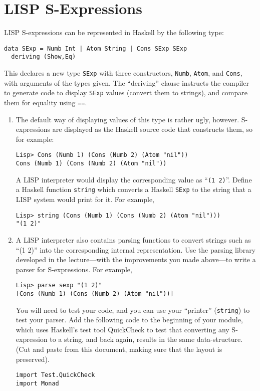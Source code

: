 \documentclass{article}
\begin{document}
\section{LISP S-Expressions}
LISP S-expressions can be represented in Haskell by the following
type:
\begin{verbatim}
data SExp = Numb Int | Atom String | Cons SExp SExp
  deriving (Show,Eq)
\end{verbatim}
This declares a new type \verb!SExp! with three constructors,
\verb!Numb!, \verb!Atom!, and \verb!Cons!, with arguments of the types
given. The ``deriving'' clause instructs the compiler to generate code
to display \verb!SExp! values (convert them to strings), and compare
them for equality using \verb!==!.

\begin{enumerate}
\item
The default way of displaying values of this type is rather ugly,
however. S-expressions are displayed as the Haskell source code that
constructs them, so for example:
\begin{verbatim}
Lisp> Cons (Numb 1) (Cons (Numb 2) (Atom "nil"))
Cons (Numb 1) (Cons (Numb 2) (Atom "nil"))
\end{verbatim}
A LISP interpreter would display the corresponding value as
``\verb!(1 2)!''. Define a Haskell function \verb!string! which
converts a Haskell \verb!SExp! to the string that a LISP system would
print for it. For example,
\begin{verbatim}
Lisp> string (Cons (Numb 1) (Cons (Numb 2) (Atom "nil")))
"(1 2)"
\end{verbatim}
\item
A LISP interpreter also contains parsing functions to convert strings
such as ``(1 2)'' into the corresponding internal representation. Use
the parsing library developed in the lecture---with the improvements
you made above---to write a parser for S-expressions. For example,
\begin{verbatim}
Lisp> parse sexp "(1 2)"
[Cons (Numb 1) (Cons (Numb 2) (Atom "nil"))]
\end{verbatim}

You will need to test your code, and you can use your ``printer''
(\verb!string!) to test your parser. Add the following code to the
beginning of your module, which uses Haskell's test tool QuickCheck to
test that converting any S-expression to a string, and back again,
results in the same data-structure. (Cut and paste from this
document, making sure that the layout is preserved).
\begin{verbatim}
import Test.QuickCheck
import Monad


\end{verbatim}
\end{enumerate}
\end{document}
